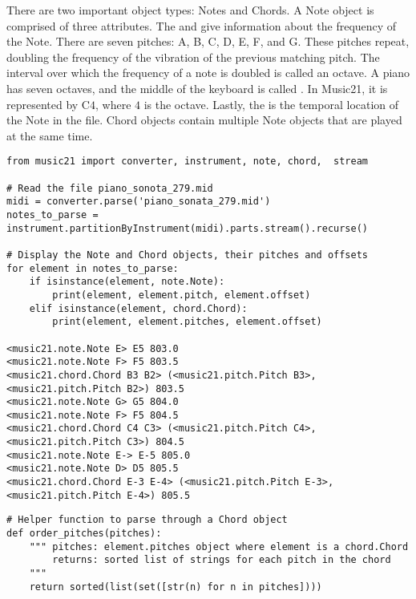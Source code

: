 There are two important object types: Notes and Chords.
A Note object is comprised of three attributes.
The  and  give information about the frequency of the Note.
There are seven pitches: A, B, C, D, E, F, and G.
These pitches repeat, doubling the frequency of the vibration of the previous matching pitch.
The interval over which the frequency of a note is doubled is called an octave.
A piano has seven octaves, and the middle of the keyboard is called .
In Music21, it is represented by C$4$, where $4$ is the octave.
Lastly, the  is the temporal location of the Note in the file.
Chord objects contain multiple Note objects that are played at the same time.


\begin{lstlisting}
from music21 import converter, instrument, note, chord,  stream
 
# Read the file piano_sonota_279.mid
midi = converter.parse('piano_sonata_279.mid')
notes_to_parse = instrument.partitionByInstrument(midi).parts.stream().recurse()

# Display the Note and Chord objects, their pitches and offsets
for element in notes_to_parse:
	if isinstance(element, note.Note): 
		print(element, element.pitch, element.offset)
	elif isinstance(element, chord.Chord):
		print(element, element.pitches, element.offset)

<music21.note.Note E> E5 803.0
<music21.note.Note F> F5 803.5
<music21.chord.Chord B3 B2> (<music21.pitch.Pitch B3>, <music21.pitch.Pitch B2>) 803.5
<music21.note.Note G> G5 804.0
<music21.note.Note F> F5 804.5
<music21.chord.Chord C4 C3> (<music21.pitch.Pitch C4>, <music21.pitch.Pitch C3>) 804.5
<music21.note.Note E-> E-5 805.0
<music21.note.Note D> D5 805.5
<music21.chord.Chord E-3 E-4> (<music21.pitch.Pitch E-3>, <music21.pitch.Pitch E-4>) 805.5

\end{lstlisting}

\begin{lstlisting}
# Helper function to parse through a Chord object
def order_pitches(pitches):
    """ pitches: element.pitches object where element is a chord.Chord
        returns: sorted list of strings for each pitch in the chord
    """
    return sorted(list(set([str(n) for n in pitches])))
\end{lstlisting}

